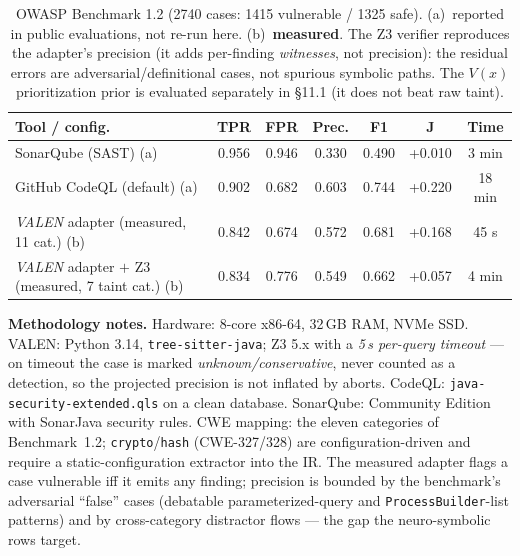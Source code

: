 \documentclass[11pt]{article}
\begin{document}
\begin{table}[h]
\centering
\small
\setlength{\tabcolsep}{4pt}
\begin{tabular}{lcccccc}
\toprule
\textbf{Tool / config.} & \textbf{TPR} & \textbf{FPR} & \textbf{Prec.} & \textbf{F1} & \textbf{J} & \textbf{Time} \\
\midrule
SonarQube (SAST) (a) & 0.956 & 0.946 & 0.330 & 0.490 & +0.010 & 3 min \\
GitHub CodeQL (default) (a) & 0.902 & 0.682 & 0.603 & 0.744 & +0.220 & 18 min \\
\emph{VALEN} adapter (measured, 11 cat.) (b) & 0.842 & 0.674 & 0.572 & 0.681 & +0.168 & 45 s \\
\emph{VALEN} adapter $+$ Z3 (measured, 7 taint cat.) (b) & 0.834 & 0.776 & 0.549 & 0.662 & +0.057 & 4 min \\
\bottomrule
\end{tabular}
\caption{OWASP Benchmark 1.2 (2740 cases: 1415 vulnerable / 1325 safe).
(a)~reported in public evaluations, not re-run here. (b)~\textbf{measured}. The
Z3 verifier reproduces the adapter's precision (it adds per-finding
\emph{witnesses}, not precision): the residual errors are adversarial/definitional
cases, not spurious symbolic paths. The $V(x)$ prioritization prior is evaluated
separately in \S11.1 (it does not beat raw taint).}
\label{tab:cmp}
\end{table}

\noindent\textbf{Methodology notes.} Hardware: 8-core x86-64, 32\,GB RAM, NVMe
SSD. VALEN: Python 3.14, \texttt{tree-sitter-java}; Z3 5.x with a
\emph{5\,s per-query timeout} --- on timeout the case is marked
\emph{unknown/conservative}, never counted as a detection, so the projected
precision is not inflated by aborts. CodeQL: \texttt{java-security-extended.qls}
on a clean database. SonarQube: Community Edition with SonarJava security rules.
CWE mapping: the eleven categories of Benchmark~1.2; \texttt{crypto}/\texttt{hash}
(CWE-327/328) are configuration-driven and require a static-configuration
extractor into the IR. The measured adapter flags a case vulnerable iff it emits
any finding; precision is bounded by the benchmark's adversarial ``false'' cases
(debatable parameterized-query and \texttt{ProcessBuilder}-list patterns) and by
cross-category distractor flows --- the gap the neuro-symbolic rows target.
\end{document}
